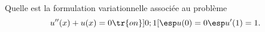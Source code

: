 \bexo
Quelle est la formulation variationnelle associée au problème
\begin{equation}
	u''(x)+u(x)=0 \tr{ on } ]0;1[\esp u(0)=0 \esp u'(1)=1. 
\end{equation}

\eexo

